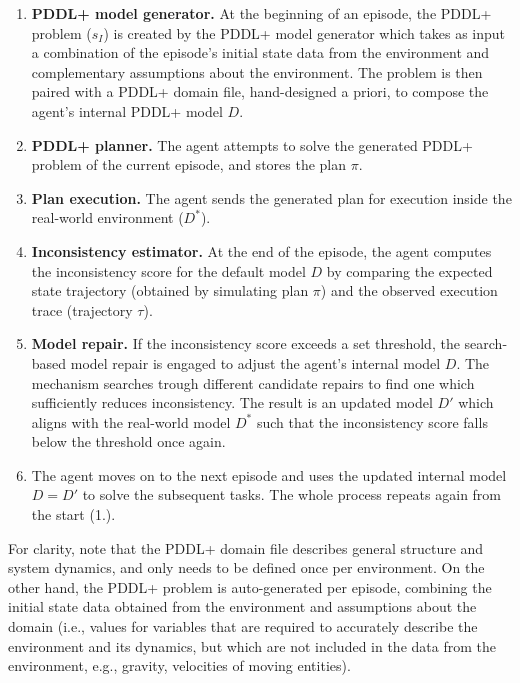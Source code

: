 \documentclass[letterpaper]{article} %
\begin{document}
\begin{enumerate}
    \item \textbf{PDDL+ model generator.} At the beginning of an episode, the PDDL+ problem ($s_I$) is created by the PDDL+ model generator which takes as input a combination of the episode's initial state data from the environment and complementary assumptions about the environment. The problem is then paired with a PDDL+ domain file, hand-designed a priori, to compose the agent's internal PDDL+ model $D$.
    \item \textbf{PDDL+ planner.} The agent attempts to solve the generated PDDL+ problem of the current episode, and stores the plan $\pi$.
    \item \textbf{Plan execution.} The agent sends the generated plan for execution inside the real-world environment ($D^*$).
    \item \textbf{Inconsistency estimator.} At the end of the episode, the agent computes the inconsistency score for the default model $D$ by comparing the expected state trajectory (obtained by simulating plan $\pi$) and the observed execution trace (trajectory $\tau$).
    \item \textbf{Model repair.} If the inconsistency score exceeds a set threshold, the search-based model repair is engaged to adjust the agent's internal model $D$. The mechanism searches trough different candidate repairs to find one which sufficiently reduces inconsistency. The result is an updated model $D'$ which aligns with the real-world model $D^*$ such that the inconsistency score falls below the threshold once again.
    \item The agent moves on to the next episode and uses the updated internal model $D=D'$ to solve the subsequent tasks. The whole process repeats again from the start (1.).
\end{enumerate}

For clarity, note that the PDDL+ domain file describes general structure and system dynamics, and only needs to be defined once per environment. On the other hand, the PDDL+ problem is auto-generated per episode, combining the initial state data obtained from the environment and assumptions about the domain (i.e., values for variables that are required to accurately describe the environment and its dynamics, but which are not included in the data from the environment, e.g., gravity, velocities of moving entities).
\end{document}

